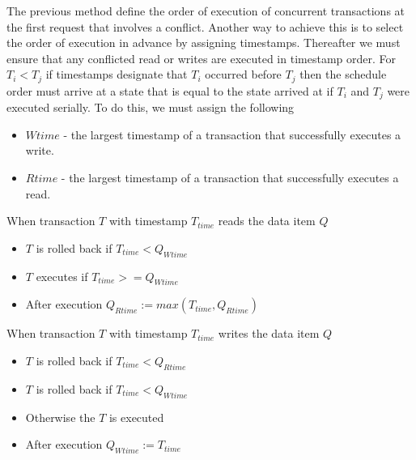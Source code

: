 \documentclass[10pt,a4paper]{article}
\begin{document}
\newline\newline
The previous method define the order of execution of concurrent transactions at the first request that involves a conflict. Another way to achieve this is to select the order of execution in advance by assigning timestamps. Thereafter we must ensure that any conflicted read or writes are executed in timestamp order. For $T_i < T_j$ if timestamps designate that $T_i$ occurred before $T_j$ then the schedule order must arrive at a state that is equal to the state arrived at if $T_i$ and $T_j$ were executed serially. 
\newline\newline
To do this, we must assign the following 
\begin{itemize}
\item $Wtime$ - the largest timestamp of a transaction that successfully executes a write.
\item $Rtime$ - the largest timestamp of a transaction that successfully executes a read. 
\end{itemize} 
When transaction $T$ with timestamp $T_{time}$ reads the data item $Q$ 
\begin{itemize}
\item $T$ is rolled back if $T_{time} < Q_{Wtime}$
\item $T$ executes if $T_{time} >= Q_{Wtime}$
\item After execution $Q_{Rtime} := max(T_{time}, Q_{Rtime})$
\end{itemize}
When transaction $T$ with timestamp $T_{time}$ writes the data item $Q$
\begin{itemize}
\item $T$ is rolled back if $T_{time} < Q_{Rtime}$
\item $T$ is rolled back if $T_{time} < Q_{Wtime}$ 
\item Otherwise the $T$ is executed 
\item After execution $Q_{Wtime} := T_{time}$
\end{itemize}
\end{document}
